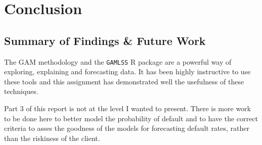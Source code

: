\section{Conclusion}

\subsection{Summary of Findings \& Future Work}

The GAM methodology and the \verb|GAMLSS| R package are a powerful way of exploring, explaining and forecasting data.
It has been highly instructive to use these tools and this assignment has demonstrated well the usefulness of these
techniques.

Part 3 of this report is not at the level I wanted to present.  There is more work to be done here
to better model the probability of default and to have the correct criteria to asses the goodness of
the models for forecasting default rates, rather than the riskiness of the client.

